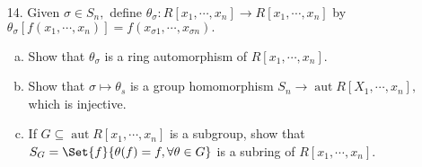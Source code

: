 \documentclass{article}
\DeclareMathOperator{\aut}{aut}
\begin{document}
\begin{itemize}
	\item[14.] Given $\sigma\in S_n,$ define $\theta_\sigma: R[x_1, \cdots, x_n]\to R[x_1, \cdots, x_n]$ by $\theta_\sigma\left[ f(x_1, \cdots, x_n) \right]=f(x_{\sigma 1}, \cdots, x_{\sigma n}).$
		\begin{enumerate}[(a)]
			\item Show that $\theta_\sigma$ is a ring automorphism of $R[x_1, \cdots, x_n].$

			\item Show that $\sigma\mapsto \theta_s$ is a group homomorphism $S_n\to \aut R[X_1, \cdots, x_n],$ which is injective.

			\item If $G\subseteq \aut R[x_1, \cdots, x_n]$ is a subgroup, show that $S_G=\Set{f}{\theta(f)=f, \forall \theta\in G}$ is a subring of $R[x_1, \cdots, x_n].$
				
		\end{enumerate}
		
\end{itemize}
\end{document}
